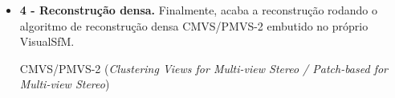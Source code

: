 \begin{itemize}


\item \textbf{4 - Reconstrução densa.} Finalmente, acaba a reconstrução rodando o algoritmo de reconstrução densa CMVS/PMVS-2 embutido no próprio VisualSfM.

CMVS/PMVS-2 ({\it Clustering Views for Multi-view Stereo / Patch-based for Multi-view Stereo})



\end{itemize}
